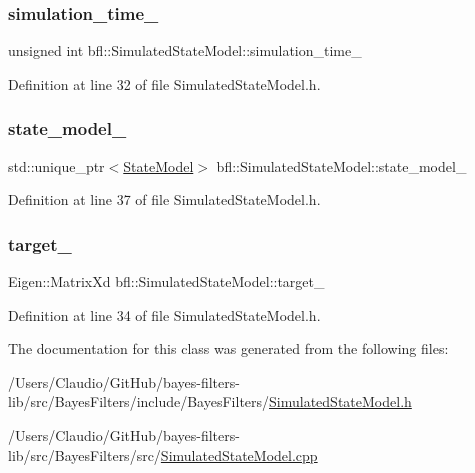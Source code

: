 \subsubsection{\texorpdfstring{simulation\+\_\+time\+\_\+}{simulation\_time\_}}
{\footnotesize\ttfamily unsigned int bfl\+::\+Simulated\+State\+Model\+::simulation\+\_\+time\+\_\+\hspace{0.3cm}{\ttfamily [private]}}



Definition at line 32 of file Simulated\+State\+Model.\+h.

\mbox{\label{classbfl_1_1SimulatedStateModel_a02e90a22420f8bbec12b97a1f46c987c}} 
\subsubsection{\texorpdfstring{state\+\_\+model\+\_\+}{state\_model\_}}
{\footnotesize\ttfamily std\+::unique\+\_\+ptr$<$\mbox{\hyperlink{classbfl_1_1StateModel}{State\+Model}}$>$ bfl\+::\+Simulated\+State\+Model\+::state\+\_\+model\+\_\+\hspace{0.3cm}{\ttfamily [protected]}}



Definition at line 37 of file Simulated\+State\+Model.\+h.

\mbox{\label{classbfl_1_1SimulatedStateModel_a0f1d1cc526d7797b3999b793ff39fd2d}} 
\subsubsection{\texorpdfstring{target\+\_\+}{target\_}}
{\footnotesize\ttfamily Eigen\+::\+Matrix\+Xd bfl\+::\+Simulated\+State\+Model\+::target\+\_\+\hspace{0.3cm}{\ttfamily [private]}}



Definition at line 34 of file Simulated\+State\+Model.\+h.



The documentation for this class was generated from the following files\+:\begin{DoxyCompactItemize}
\item 
/\+Users/\+Claudio/\+Git\+Hub/bayes-\/filters-\/lib/src/\+Bayes\+Filters/include/\+Bayes\+Filters/\mbox{\hyperlink{SimulatedStateModel_8h}{Simulated\+State\+Model.\+h}}\item 
/\+Users/\+Claudio/\+Git\+Hub/bayes-\/filters-\/lib/src/\+Bayes\+Filters/src/\mbox{\hyperlink{SimulatedStateModel_8cpp}{Simulated\+State\+Model.\+cpp}}\end{DoxyCompactItemize}
